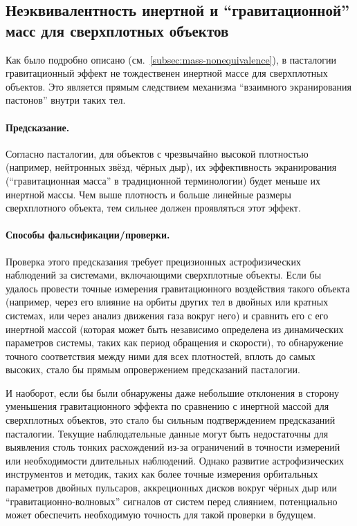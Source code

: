 \documentclass[pdflatex,sn-mathphys-num]{sn-jnl}
\begin{document}
\subsection{Неэквивалентность инертной и ``гравитационной'' масс для сверхплотных объектов}\label{subsec:mass-inequivalence}

Как было подробно описано (см.~\ref{subsec:mass-nonequivalence}), в пасталогии гравитационный эффект не тождественен инертной массе для сверхплотных объектов. Это является прямым следствием механизма ``взаимного экранирования пастонов'' внутри таких тел.

\paragraph{Предсказание.} Согласно пасталогии, для объектов с чрезвычайно высокой плотностью (например, нейтронных звёзд, чёрных дыр), их эффективность экранирования (``гравитационная масса'' в традиционной терминологии) будет меньше их инертной массы. Чем выше плотность и больше линейные размеры сверхплотного объекта, тем сильнее должен проявляться этот эффект.

\paragraph{Способы фальсификации/проверки.} Проверка этого предсказания требует прецизионных астрофизических наблюдений за системами, включающими сверхплотные объекты. Если бы удалось провести точные измерения гравитационного воздействия такого объекта (например, через его влияние на орбиты других тел в двойных или кратных системах, или через анализ движения газа вокруг него) и сравнить его с его инертной массой (которая может быть независимо определена из динамических параметров системы, таких как период обращения и скорости), то обнаружение точного соответствия между ними для всех плотностей, вплоть до самых высоких, стало бы прямым опровержением предсказаний пасталогии.

И наоборот, если бы были обнаружены даже небольшие отклонения в сторону уменьшения гравитационного эффекта по сравнению с инертной массой для сверхплотных объектов, это стало бы сильным подтверждением предсказаний пасталогии. Текущие наблюдательные данные могут быть недостаточны для выявления столь тонких расхождений из-за ограничений в точности измерений или необходимости длительных наблюдений. Однако развитие астрофизических инструментов и методик, таких как более точные измерения орбитальных параметров двойных пульсаров, аккреционных дисков вокруг чёрных дыр или ``гравитационно-волновых'' сигналов от систем перед слиянием, потенциально может обеспечить необходимую точность для такой проверки в будущем.
\end{document}
